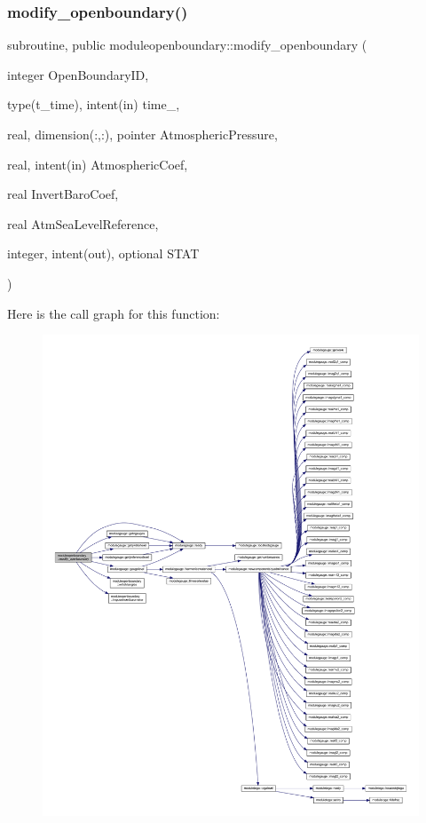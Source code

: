 \subsubsection{\texorpdfstring{modify\+\_\+openboundary()}{modify\_openboundary()}}
{\footnotesize\ttfamily subroutine, public moduleopenboundary\+::modify\+\_\+openboundary (\begin{DoxyParamCaption}\item[{integer}]{Open\+Boundary\+ID,  }\item[{type(t\+\_\+time), intent(in)}]{time\+\_\+,  }\item[{real, dimension(\+:,\+:), pointer}]{Atmospheric\+Pressure,  }\item[{real, intent(in)}]{Atmospheric\+Coef,  }\item[{real}]{Invert\+Baro\+Coef,  }\item[{real}]{Atm\+Sea\+Level\+Reference,  }\item[{integer, intent(out), optional}]{S\+T\+AT }\end{DoxyParamCaption})}

Here is the call graph for this function\+:\nopagebreak
\begin{figure}[H]
\begin{center}
\leavevmode
\includegraphics[width=350pt]{namespacemoduleopenboundary_ab4eb76c328f66777a2d624134933208e_cgraph}
\end{center}
\end{figure}
\mbox{\label{namespacemoduleopenboundary_af8f8c38fee04ad167eec9a779f717d85}} 
